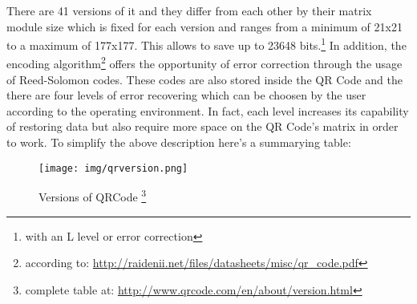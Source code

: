 There are 41 versions of it and they differ from each other by their matrix 
module size which is fixed for each version and ranges from a minimum of 21x21 
to a maximum of 177x177. This allows to save up to 23648 bits.\footnote{with an L level or error correction} 
\newline 
In addition, the encoding algorithm\footnote{ according to: \url{http://raidenii.net/files/datasheets/misc/qr_code.pdf}} offers the opportunity of error correction through the usage of Reed-Solomon codes.
These codes are also stored inside the QR Code and the there are four levels of error recovering which can be choosen by the user according to the operating environment.
In fact, each level increases its capability of restoring data but also require more space on the QR Code's matrix in order to work. 
\newpage
To simplify the above description here's a summarying table:
\begin{figure}[hbt]
    \centering
    \caption{Versions of QRCode \protect \footnote{complete table at: \protect \url{http://www.qrcode.com/en/about/version.html}}}
    \texttt{[image: img/qrversion.png]}
\end{figure}


   













  
